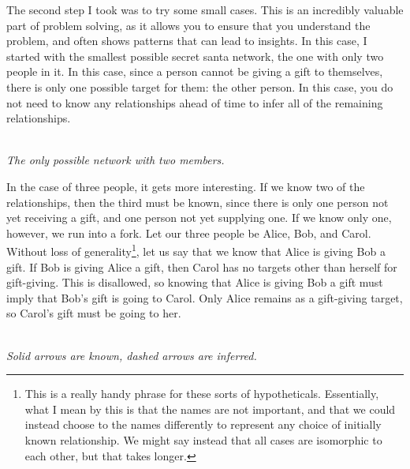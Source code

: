 \documentclass{article}
\begin{document}
The second step I took was to try some small cases. This is an incredibly valuable part of problem solving, as it allows you to ensure that you understand the problem, and often shows patterns that can lead to insights. In this case, I started with the smallest possible secret santa network, the one with only two people in it. In this case, since a person cannot be giving a gift to themselves, there is only one possible target for them: the other person. In this case, you do not need to know any relationships ahead of time to infer all of the remaining relationships.\\

\begin{center}
  \\
  \textit{The only possible network with two members.}
\end{center}

In the case of three people, it gets more interesting. If we know two of the relationships, then the third must be known, since there is only one person not yet receiving a gift, and one person not yet supplying one. If we know only one, however, we run into a fork. Let our three people be Alice, Bob, and Carol. Without loss of generality\footnote{This is a really handy phrase for these sorts of hypotheticals. Essentially, what I mean by this is that the names are not important, and that we could instead choose to the names differently to represent any choice of initially known relationship. We might say instead that all cases are isomorphic to each other, but that takes longer.}, let us say that we know that Alice is giving Bob a gift. If Bob is giving Alice a gift, then Carol has no targets other than herself for gift-giving. This is disallowed, so knowing that Alice is giving Bob a gift must imply that Bob's gift is going to Carol. Only Alice remains as a gift-giving target, so Carol's gift must be going to her.\\

\begin{center}
  \\
  \textit{Solid arrows are known, dashed arrows are inferred.}
\end{center}
\end{document}
